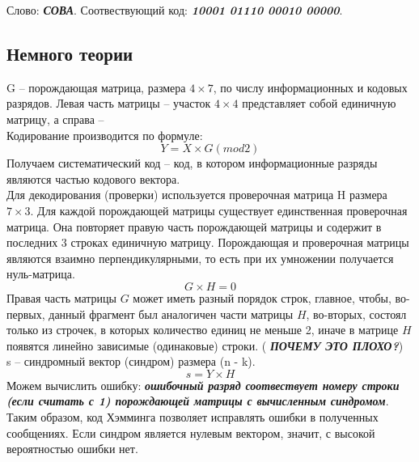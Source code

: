 \documentclass[a5paper, 10pt]{article}
\theoremstyle{definition}
\theoremstyle{plain}
\theoremstyle{remark}
\begin{document}
Слово: \textbf{\textit{СОВА}}.
Соотвествующий код: \textbf{\textit{10001 01110 00010 00000}}.

\subsection{Немного теории}
G -- порождающая матрица, размера $4 \times 7$, по числу информационных и кодовых разрядов. Левая часть матрицы -- участок  $4 \times 4$ представляет собой единичную матрицу, а справа -- \\


Кодирование производится по формуле:
\begin{equation}
Y = X \times G  (mod 2)
\end{equation}
Получаем систематический код -- код, в котором информационные разряды являются частью кодового вектора.\\

Для декодирования (проверки) используется проверочная матрица H размера $7 \times 3$. Для каждой порождающей матрицы существует единственная проверочная матрица. Она повторяет правую часть порождающей матрицы и содержит в последних 3 строках единичную матрицу. Порождающая и проверочная матрицы являются взаимно перпендикулярными, то есть при их умножении получается нуль-матрица.
\begin{equation}
G \times H  = 0
\end{equation}
Правая часть матрицы $G$ может иметь разный порядок строк, главное, чтобы, во-первых, данный фрагмент был аналогичен части матрицы $H$, во-вторых, состоял только из строчек, в которых количество единиц не меньше 2, иначе в матрице $H$ появятся линейно зависимые (одинаковые) строки. ( \textbf{\textit{ПОЧЕМУ ЭТО ПЛОХО?}})\\
s -- синдромный вектор (синдром) размера (n - k).
\begin{equation}
s = Y \times H
\end{equation}
Можем вычислить ошибку:  \textbf{\textit{ошибочный разряд соотвествует номеру строки (если считать с 1) порождающей матрицы с вычисленным синдромом}}. Таким образом, код Хэмминга позволяет исправлять ошибки в полученных сообщениях. Если синдром является нулевым вектором, значит, с высокой вероятностью ошибки нет.
\end{document}
